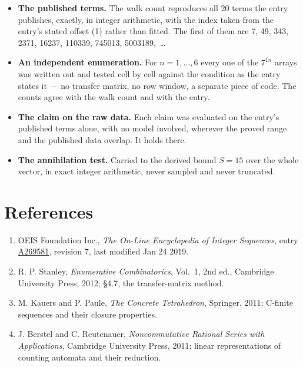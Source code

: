 \documentclass[11pt]{article}
\theoremstyle{definition}
\begin{document}
\begin{itemize}

\item {\bfseries The published terms.} The walk count reproduces all 20 terms the entry publishes, exactly, in integer arithmetic, with the index taken from the entry's stated offset (1) rather than fitted. The first of them are 7, 49, 343, 2371, 16237, 110339, 745013, 5003189,~\dots

\item {\bfseries An independent enumeration.} For $n = 1,\dots,6$ every one of the $7^{1n}$ arrays was written out and tested cell by cell against the condition as the entry states it --- no transfer matrix, no row window, a separate piece of code. The counts agree with the walk count and with the entry.

\item {\bfseries The claim on the raw data.} Each claim was evaluated on the entry's published terms alone, with no model involved, wherever the proved range and the published data overlap. It holds there.

\item {\bfseries The annihilation test.} Carried to the derived bound $S = 15$ over the whole vector, in exact integer arithmetic, never sampled and never truncated.

\end{itemize}

\section{References}

\begin{enumerate}

\item OEIS Foundation Inc., \emph{The On-Line Encyclopedia of Integer Sequences}, entry \href{https://oeis.org/A269581}{A269581}, revision 7, last modified Jan 24 2019.

\item R. P. Stanley, \emph{Enumerative Combinatorics}, Vol.~1, 2nd ed., Cambridge University Press, 2012; \S4.7, the transfer-matrix method.

\item M. Kauers and P. Paule, \emph{The Concrete Tetrahedron}, Springer, 2011; C-finite sequences and their closure properties.

\item J. Berstel and C. Reutenauer, \emph{Noncommutative Rational Series with Applications}, Cambridge University Press, 2011; linear representations of counting automata and their reduction.

\end{enumerate}
\end{document}
